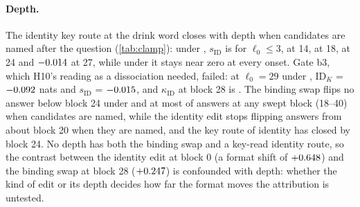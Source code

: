 \paragraph{Depth.} The identity key route at the drink word closes with depth when candidates are named after the question (\cref{tab:clamp}): under \fmtOpt{}, $s_{\mathrm{ID}}$ is \PkSidOptZero{} for $\ell_0 \leq 3$, \PkSidOptFourteen{} at 14, \PkSidOptEighteen{} at 18, \PkSidOptTwentyfour{} at 24 and $-0.014$ at 27, while under \fmtNone{} it stays near zero at every onset. Gate b3, which H10's reading as a dissociation needed, failed: at $\ell_0 = 29$ under \fmtOpt{}, $\mathrm{ID}_K$ = $-0.092$ nats and $s_{\mathrm{ID}}$ = $-0.015$, and $\kappa_{\mathrm{ID}}$ at block 28 is \PkGatebThreeKappa{}. The binding swap flips no answer below block 24 under \fmtNone{} and at most \PkSweepIIABindQnamesTwentythree{} of answers at any swept block (18--40) when candidates are named, while the identity edit stops flipping answers from about block 20 when they are named, and the key route of identity has closed by block 24. No depth has both the binding swap and a key-read identity route, so the contrast between the identity edit at block 0 (a format shift of $+0.648{}$) and the binding swap at block 28 ($+0.247{}$) is confounded with depth: whether the kind of edit or its depth decides how far the format moves the attribution is untested.

